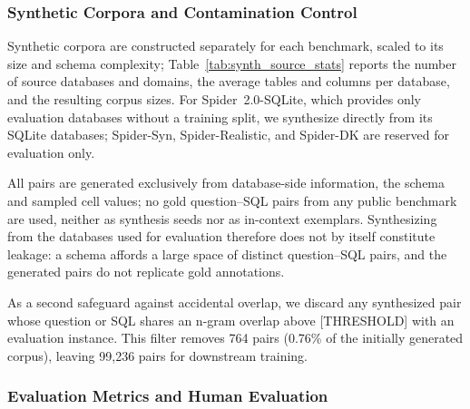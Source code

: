 \documentclass[letterpaper,journal]{IEEEtran}
\begin{document}
\subsubsection{Synthetic Corpora and Contamination Control}

\begin{table}[!t]
\centering
\caption{Database Statistics and Synthetic Corpus Sizes}
\label{tab:synth_source_stats}
\end{table}

Synthetic corpora are constructed separately for each benchmark, scaled to its size and schema complexity; Table~\ref{tab:synth_source_stats} reports the number of source databases and domains, the average tables and columns per database, and the resulting corpus sizes. For Spider~2.0-SQLite, which provides only evaluation databases without a training split, we synthesize directly from its SQLite databases; Spider-Syn, Spider-Realistic, and Spider-DK are reserved for evaluation only.

All pairs are generated exclusively from database-side information, the schema and sampled cell values; no gold question--SQL pairs from any public benchmark are used, neither as synthesis seeds nor as in-context exemplars. Synthesizing from the databases used for evaluation therefore does not by itself constitute leakage: a schema affords a large space of distinct question--SQL pairs, and the generated pairs do not replicate gold annotations.

As a second safeguard against accidental overlap, we discard any synthesized pair whose question or SQL shares an n-gram overlap above [THRESHOLD] with an evaluation instance. This filter removes 764 pairs (0.76\% of the initially generated corpus), leaving 99,236 pairs for downstream training.

\subsubsection{Evaluation Metrics and Human Evaluation}
\label{subsec:human-evaluation}\label{subsec:direct-semantic-metrics}
\end{document}
